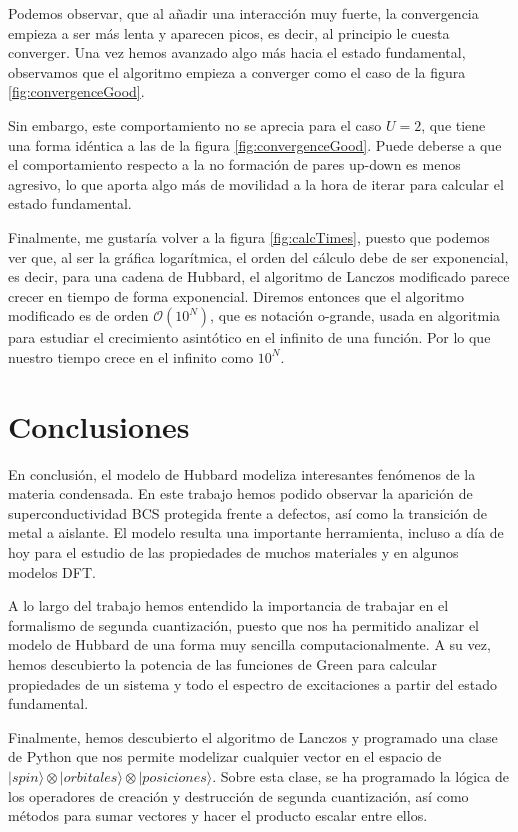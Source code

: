 \documentclass[12pt,twoside]{article}
\begin{document}
Podemos observar, que al añadir una interacción muy fuerte, la convergencia empieza a ser más lenta y aparecen picos, es decir, al principio le cuesta converger. Una vez hemos avanzado algo más hacia el estado fundamental, observamos que el algoritmo empieza a converger como el caso de la figura \ref{fig:convergenceGood}.

Sin embargo, este comportamiento no se aprecia para el caso $U = 2$, que tiene una forma idéntica a las de la figura \ref{fig:convergenceGood}. Puede deberse a que el comportamiento respecto a la no formación de pares up-down es menos agresivo, lo que aporta algo más de movilidad a la hora de iterar para calcular el estado fundamental.

Finalmente, me gustaría volver a la figura \ref{fig:calcTimes}, puesto que podemos ver que, al ser la gráfica logarítmica, el orden del cálculo debe de ser exponencial, es decir, para una cadena de Hubbard, el algoritmo de Lanczos modificado parece crecer en tiempo de forma exponencial. Diremos entonces que el algoritmo modificado es de orden $\mathcal{O}\left(10^N\right)$, que es notación o-grande, usada en algoritmia para estudiar el crecimiento asintótico en el infinito de una función. Por lo que nuestro tiempo crece en el infinito como $10^N$.
\newpage
\section{Conclusiones}

En conclusión, el modelo de Hubbard modeliza interesantes fenómenos de la materia condensada. En este trabajo hemos podido observar la aparición de superconductividad BCS protegida frente a defectos, así como la transición de metal a aislante. El modelo resulta una importante herramienta, incluso a día de hoy para el estudio de las propiedades de muchos materiales y en algunos modelos DFT.

A lo largo del trabajo hemos entendido la importancia de trabajar en el formalismo de segunda cuantización, puesto que nos ha permitido analizar el modelo de Hubbard de una forma muy sencilla computacionalmente. A su vez, hemos descubierto la potencia de las funciones de Green para calcular propiedades de un sistema y todo el espectro de excitaciones a partir del estado fundamental.

Finalmente, hemos descubierto el algoritmo de Lanczos y programado una clase de Python que nos permite modelizar cualquier vector en el espacio de $|spin\rangle\otimes|orbitales\rangle\otimes|posiciones\rangle$. Sobre esta clase, se ha programado la lógica de los operadores de creación y destrucción de segunda cuantización, así como métodos para sumar vectores y hacer el producto escalar entre ellos.
\end{document}
